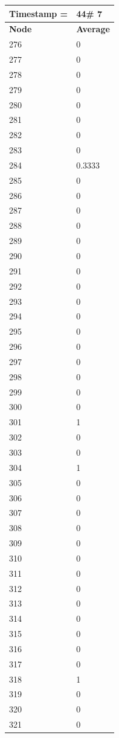 \begin{tabular}{|l||l|}
\hline
\textbf{Timestamp =} & \textbf{44}\# 7\\\hline
	\textbf{Node} & \textbf{Average} \\ \hline
\hline
	276 & 0 \\ \hline
	277 & 0 \\ \hline
	278 & 0 \\ \hline
	279 & 0 \\ \hline
	280 & 0 \\ \hline
	281 & 0 \\ \hline
	282 & 0 \\ \hline
	283 & 0 \\ \hline
	284 & 0.3333 \\ \hline
	285 & 0 \\ \hline
	286 & 0 \\ \hline
	287 & 0 \\ \hline
	288 & 0 \\ \hline
	289 & 0 \\ \hline
	290 & 0 \\ \hline
	291 & 0 \\ \hline
	292 & 0 \\ \hline
	293 & 0 \\ \hline
	294 & 0 \\ \hline
	295 & 0 \\ \hline
	296 & 0 \\ \hline
	297 & 0 \\ \hline
	298 & 0 \\ \hline
	299 & 0 \\ \hline
	300 & 0 \\ \hline
	301 & 1 \\ \hline
	302 & 0 \\ \hline
	303 & 0 \\ \hline
	304 & 1 \\ \hline
	305 & 0 \\ \hline
	306 & 0 \\ \hline
	307 & 0 \\ \hline
	308 & 0 \\ \hline
	309 & 0 \\ \hline
	310 & 0 \\ \hline
	311 & 0 \\ \hline
	312 & 0 \\ \hline
	313 & 0 \\ \hline
	314 & 0 \\ \hline
	315 & 0 \\ \hline
	316 & 0 \\ \hline
	317 & 0 \\ \hline
	318 & 1 \\ \hline
	319 & 0 \\ \hline
	320 & 0 \\ \hline
	321 & 0 \\ \hline
\end{tabular}
